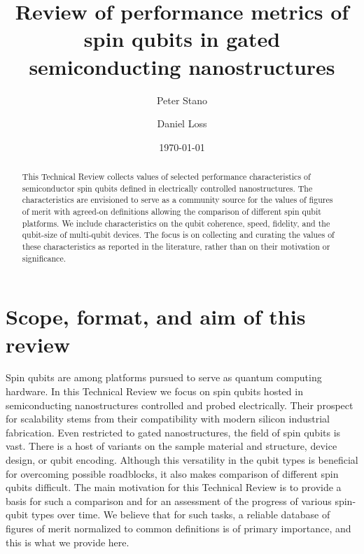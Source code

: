 \documentclass[aps, prx, showpacs, twocolumn, superscriptaddress, notitlepage, longbibliography, floatfix, nofootinbib]{revtex4-2}
\begin{document}
\title{
Review of performance metrics of spin qubits in gated semiconducting nanostructures
}
\author{Peter Stano}
\author{Daniel Loss}
\date{\today}
\begin{abstract}
This Technical Review collects values of selected performance characteristics of semiconductor spin qubits defined in electrically controlled nanostructures. The characteristics are envisioned to serve as a community source for the values of figures of merit with agreed-on definitions allowing the comparison of different spin qubit platforms. We include characteristics on the qubit coherence, speed, fidelity, and the qubit-size of multi-qubit devices. The focus is on collecting and curating the values of these characteristics as reported in the literature, rather than on their motivation or significance. 
\end{abstract}

\hypersetup{pageanchor=false}
\maketitle
\hypersetup{pageanchor=true}




\section{Scope, format, and aim of this review}
Spin qubits are among platforms pursued to serve as quantum computing hardware. In this Technical Review we focus on spin qubits hosted in semiconducting nanostructures controlled and probed electrically. Their prospect for scalability stems from their compatibility with modern silicon industrial fabrication. Even restricted to gated nanostructures, the field of spin qubits is vast. There is a host of variants on the sample material and structure, device design, or qubit encoding. Although this versatility in the qubit types is beneficial for overcoming possible roadblocks, it also makes comparison of different spin qubits difficult. The main motivation for this Technical Review is to provide a basis for such a comparison and for an assessment of the progress of various spin-qubit types over time. We believe that for such tasks, a reliable database of figures of merit normalized to common definitions is of primary importance, and this is what we provide here.
\end{document}

